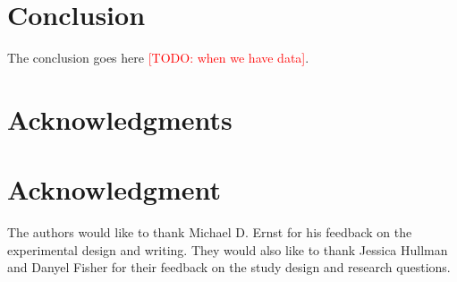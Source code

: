\documentclass[10pt,journal,compsoc]{IEEEtran}
\newcommand{\note}[2]{\textcolor{#1}{[#2]}}
\newcommand{\todo}[1]{\note{red}{TODO: #1}}
\begin{document}




\section{Conclusion}
The conclusion goes here \todo{when we have data}.


\ifCLASSOPTIONcompsoc
  \section*{Acknowledgments}
\else
  \section*{Acknowledgment}
\fi


The authors would like to thank Michael D. Ernst for his feedback on the experimental design and writing.
They would also like to thank Jessica Hullman and Danyel Fisher for their feedback on the study design and research questions.

\ifCLASSOPTIONcaptionsoff
  \newpage
\fi







%

\end{document}
